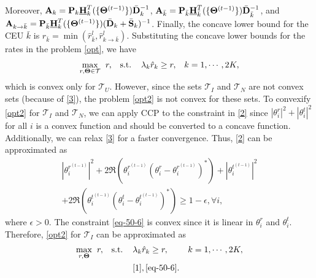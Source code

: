 \documentclass[a4, conference]{IEEEtran}
\theoremstyle{definition}
\begin{document}
Moreover,
$\mathbf{A}_{k}={\bf P}_{k}\underline{\mathbf{H}}_{k}^T(\{\bm{\Theta}^{(t-1)}\}) \bar{\mathbf{D}}_{k}^{-1}$, 
$\mathbf{A}_{\bar{k}}={\bf P}_{\bar{k}}\underline{\mathbf{H}}_{\bar{k}}^T(\{\bm{\Theta}^{(t-1)}\}) \bar{\mathbf{D}}_{\bar{k}}^{-1}$, and 
$\mathbf{A}_{k\rightarrow\bar{k}}={\bf P}_{\bar{k}}\underline{\mathbf{H}}_{k}^T(\{\bm{\Theta}^{(t-1)}\}) (\bar{\mathbf{D}}_{k}+\bar{\mathbf{S}}_{k})^{-1}$. 
Finally, the concave lower bound for the CEU $\bar{k}$ is $\hat{r}_{\bar{k}}=\min\left( \hat{r}_{\bar{k}}^l,\hat{r}_{k\rightarrow\bar{k}}^l\right)$. 
Substituting the concave lower bounds for the rates in the problem \eqref{opt}, we have 
\begin{align}\label{opt2}
\underset{
r,\bm{\Theta}\in\mathcal{T}%
}
{\max} \hspace{0.2cm}&r,
&
\text{s.t.}\hspace{0.4cm}& \lambda_{k}\hat{r}_{k}\geq r, & k=1,\cdots,2K,
\end{align}
which is convex only for $\mathcal{T}_U$. However, since the sets  $\mathcal{T}_I$ and $\mathcal{T}_N$ are not convex sets (because of \eqref{3}), the problem \eqref{opt2} is not convex for these sets.
To convexify \eqref{opt2} for $\mathcal{T}_I$ and $\mathcal{T}_N$, we can apply CCP to the constraint in \eqref{2} since $|\theta_{i}^{r}|^2+|\theta_{i}^{t}|^2$ for all $i$ is a convex function and should be converted to a concave function. Additionally, we can relax \eqref{3} for a faster convergence. %
Thus,  \eqref{2} can be approximated as
\begin{multline}\label{eq-50-6}
|\theta_{i}^{r^{(t-1)}}|^2+2\mathfrak{R}\left(\theta_{i}^{r^{(t-1)}}(\theta_{i}^r-\theta_{i}^{r^{(t-1)}})^*\right)
+\!
|\theta_{i}^{t^{(t-1)}}|^2\!
\\
+\!
2\mathfrak{R}\!\left(
\!
\theta_{i}^{t^{(t-1)}}(\theta_{i}^t-\theta_{i}^{t^{(t-1)}})^*
\!
\right)
\!\!
\geq 
\!
1-\epsilon,\forall i,
\end{multline}
where $\epsilon>0$.
The constraint \eqref{eq-50-6} is convex since %
it is linear in $\theta_{i}^r$ and $\theta_{i}^t$.
Therefore, \eqref{opt2} for $\mathcal{T}_I$ can be approximated as %
\begin{subequations}\label{opt-t-sur2}
\begin{align}%
\underset{
r,\bm{\Theta}%
}
{\max} \hspace{0.2cm}&r,
&
\text{s.t.}\hspace{0.4cm}& \lambda_{k}\hat{r}_{k}\geq r, & k=1,\cdots,2K,
\\
&&& \eqref{1},\eqref{eq-50-6}.
\end{align}
\end{subequations}
\end{document}
